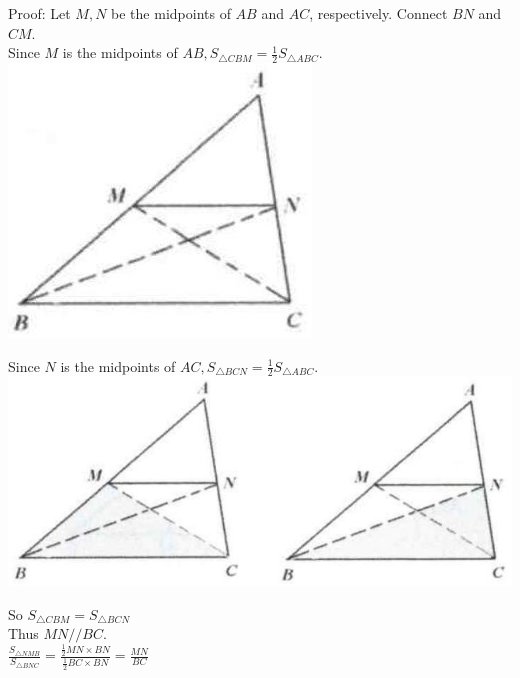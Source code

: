 \documentclass{article}
\begin{document}
Proof:
Let \(M, N\) be the midpoints of \(A B\) and \(A C\), respectively. Connect \(B N\) and \(C M\).\\
Since \(M\) is the midpoints of \(A B, S_{\triangle C B M}=\frac{1}{2} S_{\triangle A B C}\).\\
\centering
\includegraphics[width=\textwidth]{images/032.jpg}

Since \(N\) is the midpoints of \(A C, S_{\triangle B C N}=\frac{1}{2} S_{\triangle A B C}\).\\
\centering
\includegraphics[width=\textwidth]{images/032(1).jpg}

So \(S_{\triangle C B M}=S_{\triangle B C N}\)\\
Thus \(M N / / B C\).\\
\(\frac{S_{\triangle N M B}}{S_{\triangle B N C}}=\frac{\frac{1}{2} M N \times B N}{\frac{1}{2} B C \times B N}=\frac{M N}{B C}\)
\end{document}
